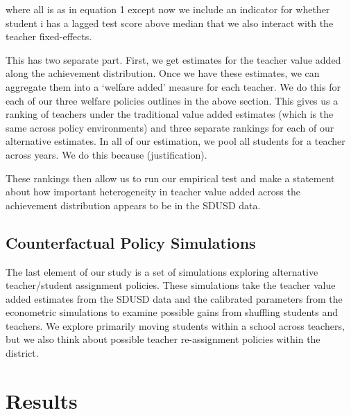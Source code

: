 \documentclass[letterpaper,12pt]{article}
\begin{document}
\noindent where all is as in equation 1 except now we include an indicator for whether student i has a lagged test score above median that we also interact with the teacher fixed-effects.
    
This has two separate part. First, we get estimates for the teacher value added along the achievement distribution. Once we have these estimates, we can aggregate them into a `welfare added' measure for each teacher. We do this for each of our three welfare policies outlines in the above section. This gives us a ranking of teachers under the traditional value added estimates (which is the same across policy environments) and three separate rankings for each of our alternative estimates. In all of our estimation, we pool all students for a teacher across years. We do this because (justification).

These rankings then allow us to run our empirical test and make a statement about how important heterogeneity in teacher value added across the achievement distribution appears to be in the SDUSD data. 




\subsection{Counterfactual Policy Simulations}

The last element of our study is a set of simulations exploring alternative teacher/student assignment policies. These simulations take the teacher value added estimates from the SDUSD data and the calibrated parameters from the econometric simulations to examine possible gains from shuffling students and teachers. We explore primarily moving students within a school across teachers, but we also think about possible teacher re-assignment policies within the district.





\section{Results}\label{sec: Results}
\end{document}
